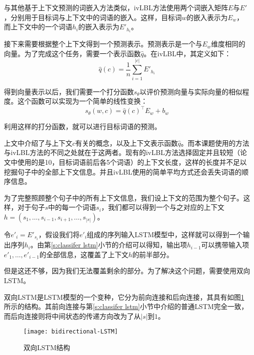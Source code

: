 与其他基于上下文预测的词嵌入方法类似，ivLBL方法使用两个词嵌入矩阵$E$与$E'$，分别用于目标词与上下文中的词语的嵌入。这样，目标词$w$的嵌入表示为$E_w$，而上下文中的一个词语$h_i$的嵌入表示为$E'_{h_i}$。

接下来需要根据整个上下文得到一个预测表示。预测表示是一个与$E_w$维度相同的向量。为了完成这个任务，需要一个表示函数$\hat{q}$。在ivLBL中，其定义如下：
\begin{equation}
\hat{q}(c) = \frac{1}{n}\sum_{i = 1}^{|c|}E'_{h_i}
\end{equation}

得到向量表示以后，我们需要一个打分函数$s_\theta$以评价预测向量与实际向量的相似程度。这个函数可以实现为一个简单的线性变换：
\begin{equation}
s_\theta(w, c) = \hat{q}(c)^\intercal E_w + b_w
\end{equation}

利用这样的打分函数，就可以进行目标词语的预测。

上文中介绍了与上下文$c$有关的概念，以及上下文表示函数$\hat{q}$。而本课题使用的方法与ivLBL方法的不同之处就在于这两者。现有的ivLBL方法选择固定并且较短（论文中使用的是10，目标词语前后各5个词语）的上下文长度，这样的长度并不足以挖掘句子中的全部上下文信息。并且ivLBL使用的简单平均方式还会丢失词语的顺序信息。

为了完整照顾整个句子中的所有上下文信息，我们设上下文的范围为整个句子。这样，对于句子$s$中的每一个词语$s_i$，我们都可以得到一个与之对应的上下文$h = (s_1, \dots, s_{i - 1}, s_{i + 1}, \dots, s_{|s|})$。

令$e'_i = E'_{s_i}$，假设我们将$e'_i$组成的序列输入LSTM模型中，这样就可以得到一个输出序列$h_i$。由第\ref{s:classifer lstm}小节的介绍可以得知，输出项$h_{i - 1}$可以携带输入项$e'_1, \dots, e'_{i - 1}$的全部信息，这覆盖了上下文$h$的前半部分。

但是这还不够，因为我们无法覆盖剩余的部分。为了解决这个问题，需要使用双向LSTM。

双向LSTM是LSTM模型的一个变种，它分为前向连接和后向连接，其具有如图\ref{f:bidirectional lstm}所示的结构。其前向连接与第\ref{s:classifer lstm}小节中介绍的普通LSTM完全一致，而后向连接则将中间状态的传递方向改为了从$|s|$到$1$。

\begin{figure}[htbp]
	\centering
	\texttt{[image: bidirectional-LSTM]}
	\caption{双向LSTM结构}
	\label{f:bidirectional lstm}
	\vspace{-1em}
\end{figure}

